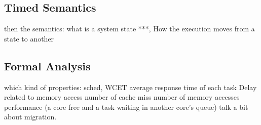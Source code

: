 \subsection{Timed Semantics}
then the semantics: what is a system state ***,
How the execution moves from a state to another
\subsection{Formal Analysis}
which kind of properties: 
sched, 
WCET
average response time of each task
Delay related to memory access
number of cache miss
number of memory accesses
performance (a core free and a task waiting in another core's queue)
talk a bit about migration.
